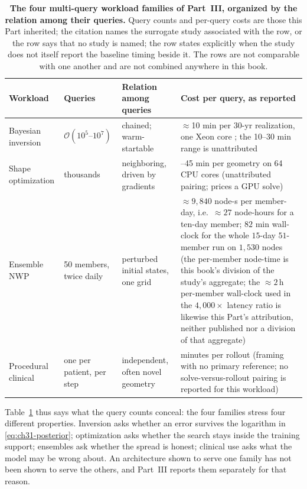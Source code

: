 \begin{table}[t]
\centering
\small
\caption{\textbf{The four multi-query workload families of Part~III, organized by the relation
among their queries.} Query counts and per-query costs are those this Part inherited; the
citation names the surrogate study associated with the row, or the row says that no study is
named; the row states
explicitly when the study does not itself report the baseline timing beside it. The rows are not
comparable with one another and are not combined anywhere in this book.}
\label{tab:ch31-workloads}
\begin{tabularx}{\textwidth}{@{}l l >{\raggedright\arraybackslash}X
  >{\raggedright\arraybackslash}X@{}}
\toprule
\textbf{Workload} & \textbf{Queries} & \textbf{Relation among queries} & \textbf{Cost per query, as reported} \\
\midrule
Bayesian inversion & $\mathcal{O}(10^{5}\text{--}10^{7})$ & chained; warm-startable & $\approx$10 min per
30-yr realization, one Xeon core \cite{wen2022ufno}; the 10--30 min range is unattributed \\
Shape optimization & thousands & neighboring, driven by gradients & 15--45 min per geometry on 64 CPU cores (unattributed pairing; \cite{li2023geometry} prices a GPU solve) \\
Ensemble NWP & 50 members, twice daily & perturbed initial states, one grid & $\approx 9{,}840$ node-s per member-day, i.e.\ $\approx 27$ node-hours for a ten-day member; $82$ min wall-clock for the whole $15$-day $51$-member run on $1{,}530$ nodes \cite{pathak2022fourcastnet} (the per-member node-time is this book's division of the study's aggregate; the $\approx 2$\,h per-member wall-clock used in the $4{,}000\times$ latency ratio is likewise this Part's attribution, neither published nor a division of that aggregate) \\
Procedural clinical & one per patient, per step & independent, often novel geometry & minutes per rollout (framing with no primary reference; no solve-versus-rollout pairing is reported for this workload) \\
\bottomrule
\end{tabularx}
\end{table}

Table~\ref{tab:ch31-workloads} thus says what the query counts conceal: the four families stress
four different properties. Inversion asks whether an error survives
the logarithm in \eqref{eq:ch31-posterior}; optimization asks whether the search stays inside the
training support; ensembles ask whether the spread is honest; clinical use asks what the model may
be wrong about. An architecture shown to serve one family has not been shown to serve the others,
and Part~III reports them separately for that reason.

